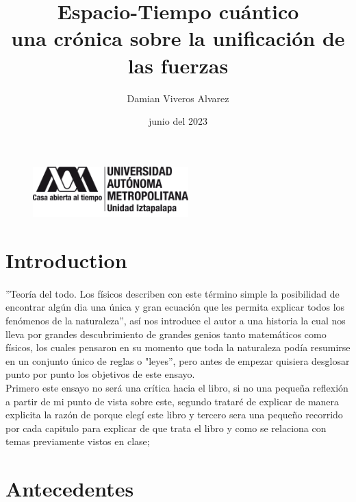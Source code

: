\documentclass[12pt]{article}
\title{\textsf{Espacio-Tiempo cuántico\\
una crónica sobre la unificación de las fuerzas}}
\date{junio del 2023}
\author{Damian Viveros Alvarez}
\begin{document}
\begin{figure}
    \includegraphics[width=60mm]{uam.png}
    \raggedleft 
\end{figure}
\maketitle{}
\section*{Introduction}
\paragraph*{}
\textsf{''Teoría del todo. Los físicos describen con este término simple la posibilidad de encontrar algún dia una única y gran ecuación 
que les permita explicar todos los fenómenos de la naturaleza'', así nos introduce el autor a una historia la cual nos lleva por grandes 
descubrimiento de grandes genios tanto matemáticos como físicos, los cuales pensaron en su momento que toda la naturaleza podía resumirse en un conjunto único de reglas o "leyes'',
pero antes de empezar quisiera desglosar punto por punto los objetivos de este ensayo.\\ Primero este ensayo no será una crítica
hacia el libro, si no una pequeña reflexión a partir de mi punto de vista sobre este, segundo trataré de explicar de manera
explicita la razón de porque elegí este libro y tercero sera una pequeño recorrido por cada capitulo para explicar de que trata
el libro y como se relaciona con temas previamente vistos en clase;}
\section*{Antecedentes}
\end{document}
